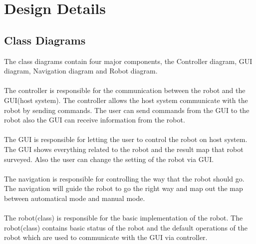 \documentclass[11pt, a4paper]{report}
\begin{document}
\chapter{Design Details}%
\label{cha:DD2}

\section{Class Diagrams}
The class diagrams contain four major components, the Controller diagram, GUI diagram, Navigation diagram and Robot diagram.\\ \\
The controller is responsible for the communication between the robot and the GUI(host system).  The controller allows the host system communicate with the robot by sending commands. The user can send commands from the GUI to the robot also the GUI can receive information from the robot.\\ \\
The GUI is responsible for letting the user to control the robot on host system. The GUI shows everything related to the robot and the result map that robot surveyed. Also the user can change the setting of the robot via GUI.\\ \\
The navigation is responsible for controlling the way that the robot should go. The navigation will guide the robot to go the right way and map out the map between automatical mode and manual mode. \\ \\
The robot(class) is responsible for the basic implementation of the robot. The robot(class) contains basic status of the robot and the default operations of the robot which are used to communicate with the GUI via controller.
\end{document}
